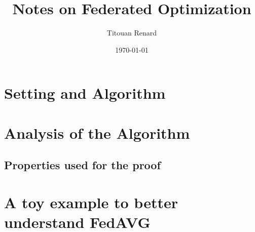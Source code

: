 \documentclass[11pt,hidelinks]{article}
\title{Notes on Federated Optimization}
\date{\today}
\author{Titouan Renard}
\begin{document}
\maketitle	
\tableofcontents

\section{Setting and Algorithm}

\newpage

\section{Analysis of the Algorithm}

\newpage
\subsection{Properties used for the proof}

\newpage

\section{A toy example to better understand FedAVG}

\newpage
\end{document}

